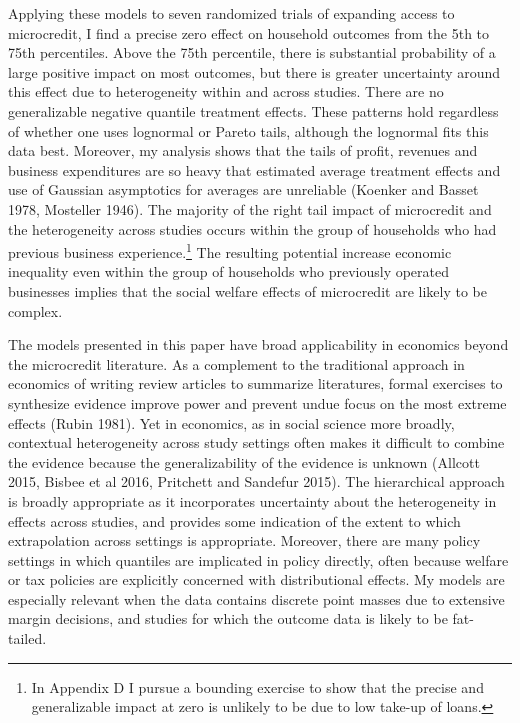 \documentclass[english,12pt]{article}\usepackage{lmodern}
\numberwithin{equation}{section}
\begin{document}
Applying these models to seven randomized trials of expanding access to microcredit, I find a precise zero effect on household outcomes from the 5th to 75th percentiles. Above the 75th percentile, there is substantial probability of a large positive impact on most outcomes, but there is greater uncertainty around this effect due to heterogeneity within and across studies. There are no generalizable negative quantile treatment effects. These patterns hold regardless of whether one uses lognormal or Pareto tails, although the lognormal fits this data best. Moreover, my analysis shows that the tails of profit, revenues and business expenditures are so heavy that estimated average treatment effects and use of Gaussian asymptotics for averages are unreliable (Koenker and Basset 1978, Mosteller 1946). The majority of the right tail impact of microcredit and the heterogeneity across studies occurs within the group of households who had previous business experience.\footnote{In Appendix D I pursue a bounding exercise to show that the precise and generalizable impact at zero is unlikely to be due to low take-up of loans.} The resulting potential increase economic inequality even within the group of households who previously operated businesses implies that the social welfare effects of microcredit are likely to be complex.

The models presented in this paper have broad applicability in economics beyond the microcredit literature. As a complement to the traditional approach in economics of writing review articles to summarize literatures, formal exercises to synthesize evidence improve power and prevent undue focus on the most extreme effects (Rubin 1981). Yet in economics, as in social science more broadly, contextual heterogeneity across study settings often makes it difficult to combine the evidence because the generalizability of the evidence is unknown (Allcott 2015, Bisbee et al 2016, Pritchett and Sandefur 2015). The hierarchical approach is broadly appropriate as it incorporates uncertainty about the heterogeneity in effects across studies, and provides some indication of the extent to which extrapolation across settings is appropriate. Moreover, there are many policy settings in which quantiles are implicated in policy directly, often because welfare or tax policies are explicitly concerned with distributional effects. My models are especially relevant when the data contains discrete point masses due to extensive margin decisions, and studies for which the outcome data is likely to be fat-tailed. 
\end{document}
